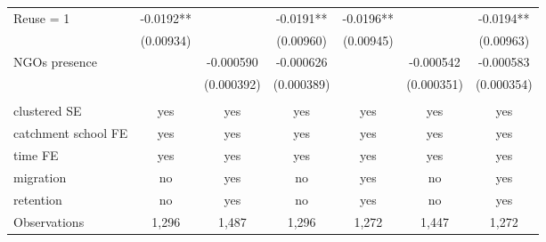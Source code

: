 \documentclass[12pt]{article}
\theoremstyle{plain}
\theoremstyle{plain}
\theoremstyle{plain}
\theoremstyle{definition}
\theoremstyle{plain}
\theoremstyle{definition}
\theoremstyle{plain}
\theoremstyle{remark}
\theoremstyle{definition}
\theoremstyle{definition}
\theoremstyle{plain}
\begin{document}
\begin{table}[H]
{\begin{tabular}{p{4.055em}llllll}
			\multicolumn{1}{l}{Reuse = 1} & \multicolumn{1}{c}{-0.0192**} & \multicolumn{1}{c}{} & \multicolumn{1}{c}{-0.0191**} & \multicolumn{1}{c}{-0.0196**} & \multicolumn{1}{c}{} & \multicolumn{1}{c}{-0.0194**} \\
			\multicolumn{1}{l}{} & \multicolumn{1}{c}{(0.00934)} & \multicolumn{1}{c}{} & \multicolumn{1}{c}{(0.00960)} & \multicolumn{1}{c}{(0.00945)} & \multicolumn{1}{c}{} & \multicolumn{1}{c}{(0.00963)} \\
			\multicolumn{1}{l}{NGOs presence} & \multicolumn{1}{c}{} & \multicolumn{1}{c}{-0.000590} & \multicolumn{1}{c}{-0.000626} & \multicolumn{1}{c}{} & \multicolumn{1}{c}{-0.000542} & \multicolumn{1}{c}{-0.000583} \\
			\multicolumn{1}{l}{} & \multicolumn{1}{c}{} & \multicolumn{1}{c}{(0.000392)} & \multicolumn{1}{c}{(0.000389)} & \multicolumn{1}{c}{} & \multicolumn{1}{c}{(0.000351)} & \multicolumn{1}{c}{(0.000354)} \\
			\multicolumn{1}{l}{} & \multicolumn{1}{c}{} & \multicolumn{1}{c}{} & \multicolumn{1}{c}{} & \multicolumn{1}{c}{} & \multicolumn{1}{c}{} & \multicolumn{1}{c}{} \\
			\multicolumn{1}{l}{clustered SE} & \multicolumn{1}{c}{yes} & \multicolumn{1}{c}{yes} & \multicolumn{1}{c}{yes} & \multicolumn{1}{c}{yes} & \multicolumn{1}{c}{yes} & \multicolumn{1}{c}{yes} \\
			\multicolumn{1}{l}{catchment school FE} & \multicolumn{1}{c}{yes} & \multicolumn{1}{c}{yes} & \multicolumn{1}{c}{yes} & \multicolumn{1}{c}{yes} & \multicolumn{1}{c}{yes} & \multicolumn{1}{c}{yes} \\
			\multicolumn{1}{l}{time FE} & \multicolumn{1}{c}{yes} & \multicolumn{1}{c}{yes} & \multicolumn{1}{c}{yes} & \multicolumn{1}{c}{yes} & \multicolumn{1}{c}{yes} & \multicolumn{1}{c}{yes} \\
			\multicolumn{1}{l}{migration} & \multicolumn{1}{c}{no} & \multicolumn{1}{c}{yes} & \multicolumn{1}{c}{no} & \multicolumn{1}{c}{yes} & \multicolumn{1}{c}{no} & \multicolumn{1}{c}{yes} \\
			\multicolumn{1}{l}{retention} & \multicolumn{1}{c}{no} & \multicolumn{1}{c}{yes} & \multicolumn{1}{c}{no} & \multicolumn{1}{c}{yes} & \multicolumn{1}{c}{no} & \multicolumn{1}{c}{yes} \\
			\multicolumn{1}{l}{Observations} & \multicolumn{1}{c}{1,296} & \multicolumn{1}{c}{1,487} & \multicolumn{1}{c}{1,296} & \multicolumn{1}{c}{1,272} & \multicolumn{1}{c}{1,447} & \multicolumn{1}{c}{1,272} \\

\end{tabular}}
\end{table}
\end{document}
